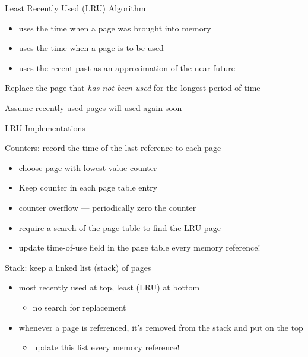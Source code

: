 \begin{frame}{Least Recently Used (LRU) Algorithm}
  \begin{itemize}
  \item[FIFO] uses the time when a page was brought into memory
  \item[OPT] uses the time when a page is to be used
  \item[LRU] uses the recent past as an approximation of the near future
  \end{itemize}
  Replace the page that \emph{has not been used} for the longest period of time
  \begin{iblock}{Assume recently-used-pages will used again soon}
    \begin{center}
    \end{center}
  \end{iblock}
\end{frame}

\begin{frame}{LRU Implementations}
  \begin{iblock}{\alert{Counters}: record the time of the last reference
      to each page}
    \begin{itemize}
    \item choose page with lowest value counter
    \item Keep counter in each page table entry
    \item counter overflow --- periodically zero the counter
    \item require a \alert{search} of the page table to find the LRU page
    \item update time-of-use field in the page table \alert{every memory reference!}
    \end{itemize}
  \end{iblock}
  \begin{iblock}{\alert{Stack}: keep a linked list (stack) of pages}
    \begin{itemize}
    \item most recently used at top, least (LRU) at bottom
      \begin{itemize}
      \item no search for replacement
      \end{itemize}
    \item whenever a page is referenced, it's removed from the stack and put on the top
      \begin{itemize}
      \item update this list \alert{every memory reference!}
      \end{itemize}
    \end{itemize}
  \end{iblock}
\end{frame}

